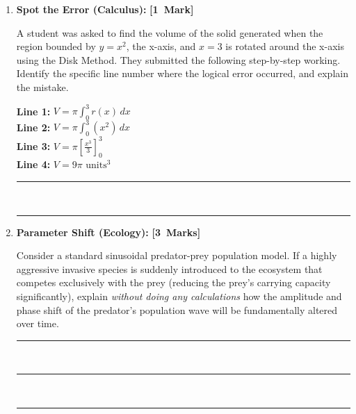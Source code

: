 \documentclass[11pt, a4paper]{article}
\begin{document}
\begin{enumerate}[resume, label=\textbf{\arabic*.}, leftmargin=*]
\vspace{0.2cm}
\noindent\rule{\linewidth}{0.4pt}\\[0.4cm]
\noindent\rule{\linewidth}{0.4pt}\\[0.4cm]
\noindent\rule{\linewidth}{0.4pt}\\[0.4cm]
\noindent\rule{\linewidth}{0.4pt}

\needspace{6cm}
\item \textbf{Spot the Error (Calculus):} \hfill\quad\mbox{\textbf{[1 Mark]}}
\begin{tcolorbox}[colback=white, colframe=black!50, arc=2mm, boxrule=0.8pt]
A student was asked to find the volume of the solid generated when the region bounded by $y = x^2$, the x-axis, and $x=3$ is rotated around the x-axis using the Disk Method. They submitted the following step-by-step working. Identify the specific line number where the logical error occurred, and explain the mistake.

\begin{tcolorbox}[colback=red!5, colframe=red!60!black, title=\textbf{Student's Working}]
\textbf{Line 1:} $V = \pi \int_{0}^{3} r(x) \, dx$ \\
\textbf{Line 2:} $V = \pi \int_{0}^{3} (x^2) \, dx$ \\
\textbf{Line 3:} $V = \pi \left[ \frac{x^3}{3} \right]_{0}^{3}$ \\
\textbf{Line 4:} $V = 9\pi \text{ units}^3$
\end{tcolorbox}

\vspace{0.2cm}
\noindent\rule{\linewidth}{0.4pt}\\[0.4cm]
\noindent\rule{\linewidth}{0.4pt}
\end{tcolorbox}

\needspace{6cm}
\item \textbf{Parameter Shift (Ecology):} \hfill\quad\mbox{\textbf{[3 Marks]}}
\begin{tcolorbox}[colback=white, colframe=black!50, arc=2mm, boxrule=0.8pt]
Consider a standard sinusoidal predator-prey population model. If a highly aggressive invasive species is suddenly introduced to the ecosystem that competes exclusively with the prey (reducing the prey's carrying capacity significantly), explain \textit{without doing any calculations} how the amplitude and phase shift of the predator's population wave will be fundamentally altered over time.

\vspace{0.2cm}
\noindent\rule{\linewidth}{0.4pt}\\[0.4cm]
\noindent\rule{\linewidth}{0.4pt}\\[0.4cm]
\noindent\rule{\linewidth}{0.4pt}
\end{tcolorbox}


\end{enumerate}
\end{document}
